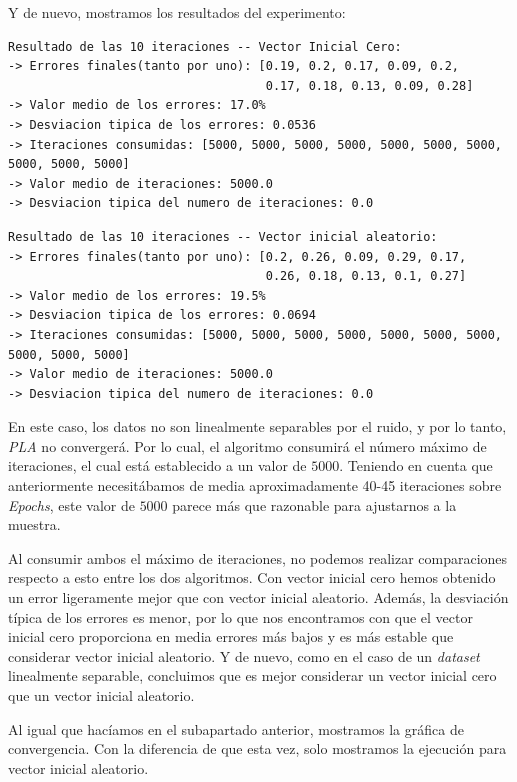 \documentclass[11pt]{article}
\begin{document}
Y de nuevo, mostramos los resultados del experimento:

\begin{lstlisting}[caption={Resultados para vector inicial cero y ruido en las etiquetas}, captionpos=b]
Resultado de las 10 iteraciones -- Vector Inicial Cero:
-> Errores finales(tanto por uno): [0.19, 0.2, 0.17, 0.09, 0.2,
                                    0.17, 0.18, 0.13, 0.09, 0.28]
-> Valor medio de los errores: 17.0%
-> Desviacion tipica de los errores: 0.0536
-> Iteraciones consumidas: [5000, 5000, 5000, 5000, 5000, 5000, 5000, 5000, 5000, 5000]
-> Valor medio de iteraciones: 5000.0
-> Desviacion tipica del numero de iteraciones: 0.0
\end{lstlisting}


\begin{lstlisting}[caption={Resultados para vector inicial aleatorio y ruido en las etiquetas}, captionpos=b]
Resultado de las 10 iteraciones -- Vector inicial aleatorio:
-> Errores finales(tanto por uno): [0.2, 0.26, 0.09, 0.29, 0.17,
                                    0.26, 0.18, 0.13, 0.1, 0.27]
-> Valor medio de los errores: 19.5%
-> Desviacion tipica de los errores: 0.0694
-> Iteraciones consumidas: [5000, 5000, 5000, 5000, 5000, 5000, 5000, 5000, 5000, 5000]
-> Valor medio de iteraciones: 5000.0
-> Desviacion tipica del numero de iteraciones: 0.0
\end{lstlisting}

En este caso, los datos no son linealmente separables por el ruido, y por lo tanto, \emph{PLA} no convergerá. Por lo cual, el algoritmo consumirá el número máximo de iteraciones, el cual está establecido a un valor de $5000$. Teniendo en cuenta que anteriormente necesitábamos de media aproximadamente 40-45 iteraciones sobre \emph{Epochs}, este valor de $5000$ parece más que razonable para ajustarnos a la muestra.

Al consumir ambos el máximo de iteraciones, no podemos realizar comparaciones respecto a esto entre los dos algoritmos. Con vector inicial cero hemos obtenido un error ligeramente mejor que con vector inicial aleatorio. Además, la desviación típica de los errores es menor, por lo que nos encontramos con que el vector inicial cero proporciona en media errores más bajos y es más estable que considerar vector inicial aleatorio. Y de nuevo, como en el caso de un \emph{dataset} linealmente separable, concluimos que es mejor considerar un vector inicial cero que un vector inicial aleatorio.

Al igual que hacíamos en el subapartado anterior, mostramos la gráfica de convergencia. Con la diferencia de que esta vez, solo mostramos la ejecución para vector inicial aleatorio.
\end{document}
